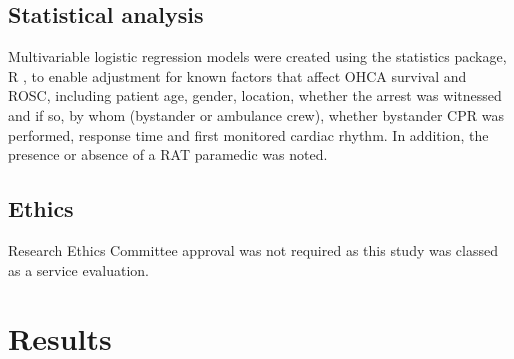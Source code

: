 \documentclass[]{article}
\theoremstyle{definition}
\theoremstyle{definition}
\theoremstyle{definition}
\theoremstyle{remark}
\begin{document}
\hypertarget{statistical-analysis}{%
\subsection{Statistical analysis}\label{statistical-analysis}}

Multivariable logistic regression models were created using the
statistics package, R \citep{R-base}, to enable adjustment for known
factors that affect OHCA survival and ROSC, including patient age,
gender, location, whether the arrest was witnessed and if so, by whom
(bystander or ambulance crew), whether bystander CPR was performed,
response time and first monitored cardiac rhythm. In addition, the
presence or absence of a RAT paramedic was noted.

\hypertarget{ethics}{%
\subsection{Ethics}\label{ethics}}

Research Ethics Committee approval was not required as this study was
classed as a service evaluation.

\hypertarget{results-1}{%
\section{Results}\label{results-1}}
\end{document}
